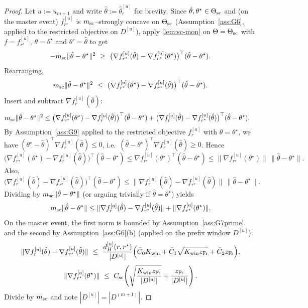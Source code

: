 \documentclass{statsoc}
\newcommand{\1}{\mathbbm{1}}
\begin{document}
\begin{proof}
Let $u:=u_{m+1}$ and write $\hat\theta:=\hat\theta_r^{[u]}$ for brevity.
Since $\hat\theta,\theta^\star\in\Theta_{\rm sc}$ and (on the master event) $f_{r^\star}^{[u]}$ is $m_{\rm sc}$--strongly concave on $\Theta_{\rm sc}$
(Assumption~\ref{ass:G6}, applied to the restricted objective on $D^{[u]}$), apply \cref{lem:sc-mon} on $\Theta=\Theta_{\rm sc}$ with
$f=f_{r^\star}^{[u]}$, $\theta=\theta^\star$ and $\theta'=\hat\theta$ to get
\[
-m_{\rm sc}\|\hat\theta-\theta^\star\|^2\ \ge\ \big(\nabla f_{r^\star}^{[u]}(\hat\theta)-\nabla f_{r^\star}^{[u]}(\theta^\star)\big)^\top(\hat\theta-\theta^\star).
\]
Rearranging,
\[
m_{\rm sc}\|\hat\theta-\theta^\star\|^2\ \le\ \big(\nabla f_{r^\star}^{[u]}(\theta^\star)-\nabla f_{r^\star}^{[u]}(\hat\theta)\big)^\top(\hat\theta-\theta^\star).
\]
Insert and subtract $\nabla f_r^{[u]}(\hat\theta)$:
\begin{align*}
m_{\rm sc}\|\hat\theta-\theta^\star\|^2
&\le \big(\nabla f_{r^\star}^{[u]}(\theta^\star)-\nabla f_r^{[u]}(\hat\theta)\big)^\top(\hat\theta-\theta^\star)
+ \big(\nabla f_r^{[u]}(\hat\theta)-\nabla f_{r^\star}^{[u]}(\hat\theta)\big)^\top(\hat\theta-\theta^\star).
\end{align*}
By Assumption~\ref{ass:G9} applied to the restricted objective $f_r^{[u]}$ with $\theta=\theta^\star$, we have
$(\theta^\star-\hat\theta)^\top \nabla f_r^{[u]}(\hat\theta)\le 0$, i.e.\ $(\hat\theta-\theta^\star)^\top \nabla f_r^{[u]}(\hat\theta)\ge 0$. Hence
\[
\big(\nabla f_{r^\star}^{[u]}(\theta^\star)-\nabla f_r^{[u]}(\hat\theta)\big)^\top(\hat\theta-\theta^\star)
\le \nabla f_{r^\star}^{[u]}(\theta^\star)^\top(\hat\theta-\theta^\star)
\le \|\nabla f_{r^\star}^{[u]}(\theta^\star)\|\,\|\hat\theta-\theta^\star\|.
\]
Also,
\[
\big(\nabla f_r^{[u]}(\hat\theta)-\nabla f_{r^\star}^{[u]}(\hat\theta)\big)^\top(\hat\theta-\theta^\star)
\le \|\nabla f_r^{[u]}(\hat\theta)-\nabla f_{r^\star}^{[u]}(\hat\theta)\|\,\|\hat\theta-\theta^\star\|.
\]
Dividing by $m_{\rm sc}\|\hat\theta-\theta^\star\|$ (or arguing trivially if $\hat\theta=\theta^\star$) yields
\[
m_{\rm sc}\|\hat\theta-\theta^\star\|
\le \|\nabla f_r^{[u]}(\hat\theta)-\nabla f_{r^\star}^{[u]}(\hat\theta)\| + \|\nabla f_{r^\star}^{[u]}(\theta^\star)\|.
\]
On the master event, the first norm is bounded by Assumption~\ref{ass:G7prime}, and the second by Assumption~\ref{ass:G6}(b) (applied on the prefix window $D^{[u]}$):
\[
\|\nabla f_r^{[u]}(\hat\theta)-\nabla f_{r^\star}^{[u]}(\hat\theta)\|
\ \le\ \frac{d_H^{[u]}(r,r^\star)}{|D^{[u]}|}\Big(\bar C_0 K_{\rm win} + \bar C_1\sqrt{K_{\rm win} z_{\rm Fr}} + \bar C_2 z_{\rm Fr}\Big),
\]
\[
\|\nabla f_{r^\star}^{[u]}(\theta^\star)\|
\ \le\ C_{\rm sc}\!\left(\sqrt{\frac{K_{\rm win} z_{\rm Fr}}{|D^{[u]}|}} + \frac{z_{\rm Fr}}{|D^{[u]}|}\right).
\]
Divide by $m_{\rm sc}$ and note $|D^{[u]}|=|D^{(m+1)}|$.
\end{proof}
\end{document}
